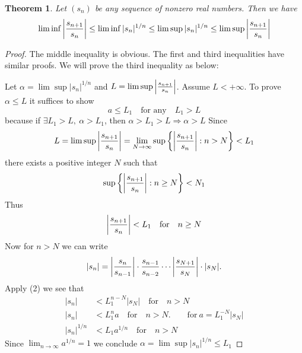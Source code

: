 \documentclass[12pt, lettersize]{book}
\theoremstyle{plain}
\newtheorem{thm}{Theorem}[section]
\theoremstyle{definition}
\theoremstyle{remark}
\begin{document}
		\setcounter{equation}{0}
		\begin{thm}\label{thm:12.2}
		Let $(s_n)$ be any sequence of nonzero real numbers. Then we have
		\begin{displaymath}
			\lim\inf\abs{\frac{s_{n+1}}{s_n}}\leq\lim\inf|s_n|^{1/n}\leq\lim\sup|s_n|^{1/n}\leq\lim\sup\abs{\frac{s_{n+1}}{s_n}}
		\end{displaymath}
		\end{thm}
		\begin{proof}
			The middle inequality is obvious. The first and third inequalities have similar proofs. We will prove the third
			inequality as below:
			
			Let $\alpha=\lim\sup|s_n|^{1/n}$ and $L=\lim\sup\abs{\frac{s_{n+1}}{s_n}}$. Assume $L<+\infty$. To prove $\alpha\leq L$ it suffices to show
			\begin{equation}
				a\leq L_1\quad\text{for any}\quad L_1>L
			\end{equation}
			because if $\exists L_1>L,\ \alpha>L_1$, then $\alpha>L_1>L\Rightarrow\alpha>L$
			Since
			\begin{displaymath}
				L=\lim\sup\abs{\frac{s_{n+1}}{s_n}}=\lim\limits_{N\rightarrow\infty}\sup \left\{ \abs{\frac{s_{n+1}}{s_n}}: n>N \right\} <L_1
			\end{displaymath}
			there exists a positive integer $N$ such that
			\begin{displaymath}
				\sup\left\{\abs{\frac{s_{n+1}}{s_n}}: n\geq N\right\}<N_1
			\end{displaymath}
			Thus
			\begin{equation}
				\abs{\frac{s_{n+1}}{s_n}}<L_1\quad\text{for}\quad n\geq N
			\end{equation}
			Now for $n>N$ we can write
			\begin{displaymath}
				|s_n|=\abs{\frac{s_n}{s_{n-1}}}\cdot\frac{s_{n-1}}{s_{n-2}}\cdots\abs{\frac{s_{N+1}}{s_N}}\cdot|s_N|.
			\end{displaymath}
			Apply (2) we see that
			\begin{align*}
				|s_n|&<L_1^{n-N}|s_N|\quad\text{for}\quad n>N\\
				|s_n|&<L_1^na\quad\text{for}\quad n>N.\qquad \text{for}\ a=L_1^{-N}|s_N|\\
				|s_n|^{1/n}&<L_1a^{1/n}\quad\text{for}\quad n>N
			\end{align*}
			Since $\lim_{n\rightarrow\infty}a^{1/n}=1$ we conclude $\alpha=\lim\sup|s_n|^{1/n}\leq L_1$
		\end{proof}
		
\end{document}
